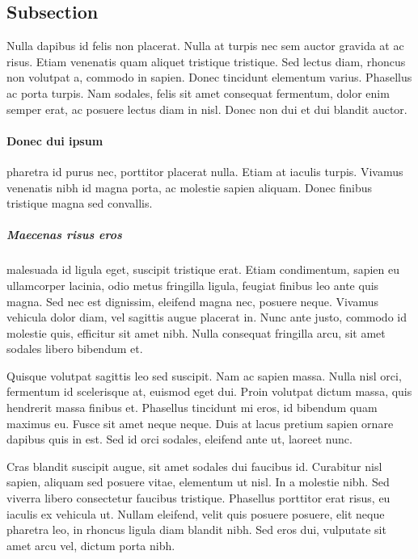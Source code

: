 \documentclass[report.tex]{subfiles}
\begin{document}
\subsection{Subsection}
Nulla dapibus id felis non placerat. Nulla at turpis nec sem auctor gravida at ac risus.
Etiam venenatis quam aliquet tristique tristique. Sed lectus diam, rhoncus non volutpat a,
commodo in sapien. Donec tincidunt elementum varius. Phasellus ac porta turpis. Nam sodales,
felis sit amet consequat fermentum, dolor enim semper erat, ac posuere lectus diam in nisl.
Donec non dui et dui blandit auctor.

\paragraph{Donec dui ipsum} pharetra id purus nec, porttitor placerat nulla. Etiam at iaculis turpis.
Vivamus venenatis nibh id magna porta, ac molestie sapien aliquam. Donec finibus tristique magna
sed convallis.

\subparagraph{Maecenas risus eros} malesuada id ligula eget, suscipit tristique erat. Etiam
condimentum, sapien eu ullamcorper lacinia, odio metus fringilla ligula, feugiat finibus leo ante
quis magna. Sed nec est dignissim, eleifend magna nec, posuere neque. Vivamus vehicula dolor diam,
vel sagittis augue placerat in. Nunc ante justo, commodo id molestie quis, efficitur sit amet nibh.
Nulla consequat fringilla arcu, sit amet sodales libero bibendum et.

Quisque volutpat sagittis leo sed suscipit. Nam ac sapien massa. Nulla nisl orci, fermentum id
scelerisque at, euismod eget dui. Proin volutpat dictum massa, quis hendrerit massa finibus et.
Phasellus tincidunt mi eros, id bibendum quam maximus eu. Fusce sit amet neque neque. Duis at lacus
pretium sapien ornare dapibus quis in est. Sed id orci sodales, eleifend ante ut, laoreet nunc.

Cras blandit suscipit augue, sit amet sodales dui faucibus id. Curabitur nisl sapien, aliquam sed
posuere vitae, elementum ut nisl. In a molestie nibh. Sed viverra libero consectetur faucibus tristique.
Phasellus porttitor erat risus, eu iaculis ex vehicula ut. Nullam eleifend, velit quis posuere
posuere, elit neque pharetra leo, in rhoncus ligula diam blandit nibh. Sed eros dui, vulputate sit
amet arcu vel, dictum porta nibh.
\end{document}
